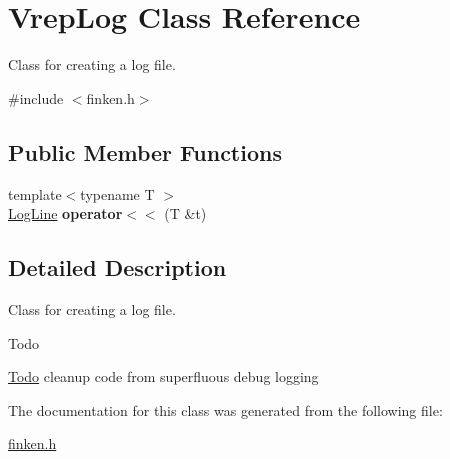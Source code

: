 \hypertarget{classVrepLog}{}\section{Vrep\+Log Class Reference}
\label{classVrepLog}


Class for creating a log file.  




{\ttfamily \#include $<$finken.\+h$>$}

\subsection*{Public Member Functions}
\begin{DoxyCompactItemize}
\item 
{\footnotesize template$<$typename T $>$ }\\\hyperlink{classLogLine}{Log\+Line} {\bfseries operator$<$$<$} (T \&t)\hypertarget{classVrepLog_a1a2744fc0ca891c3bf9767395791914b}{}\label{classVrepLog_a1a2744fc0ca891c3bf9767395791914b}

\end{DoxyCompactItemize}


\subsection{Detailed Description}
Class for creating a log file. 

\begin{DoxyRefDesc}{Todo}
\item[\hyperlink{todo__todo000004}{Todo}]cleanup code from superfluous debug logging \end{DoxyRefDesc}


The documentation for this class was generated from the following file\+:\begin{DoxyCompactItemize}
\item 
\hyperlink{finken_8h}{finken.\+h}\end{DoxyCompactItemize}
